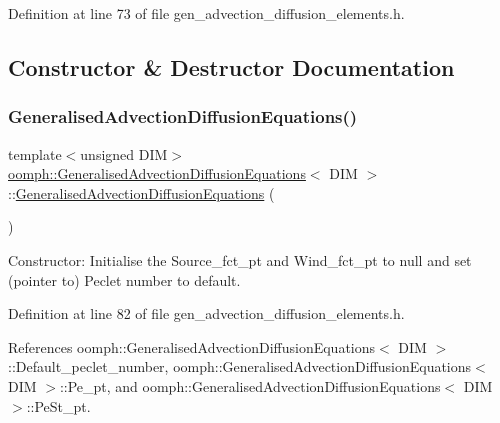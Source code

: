 Definition at line 73 of file gen\+\_\+advection\+\_\+diffusion\+\_\+elements.\+h.



\subsection{Constructor \& Destructor Documentation}
\mbox{\label{classoomph_1_1GeneralisedAdvectionDiffusionEquations_a396bf7221fdeddac42b41599ba81e9f3}} 
\subsubsection{\texorpdfstring{Generalised\+Advection\+Diffusion\+Equations()}{GeneralisedAdvectionDiffusionEquations()}\hspace{0.1cm}{\footnotesize\ttfamily [1/2]}}
{\footnotesize\ttfamily template$<$unsigned D\+IM$>$ \\
\hyperlink{classoomph_1_1GeneralisedAdvectionDiffusionEquations}{oomph\+::\+Generalised\+Advection\+Diffusion\+Equations}$<$ D\+IM $>$\+::\hyperlink{classoomph_1_1GeneralisedAdvectionDiffusionEquations}{Generalised\+Advection\+Diffusion\+Equations} (\begin{DoxyParamCaption}{ }\end{DoxyParamCaption})\hspace{0.3cm}{\ttfamily [inline]}}



Constructor\+: Initialise the Source\+\_\+fct\+\_\+pt and Wind\+\_\+fct\+\_\+pt to null and set (pointer to) Peclet number to default. 



Definition at line 82 of file gen\+\_\+advection\+\_\+diffusion\+\_\+elements.\+h.



References oomph\+::\+Generalised\+Advection\+Diffusion\+Equations$<$ D\+I\+M $>$\+::\+Default\+\_\+peclet\+\_\+number, oomph\+::\+Generalised\+Advection\+Diffusion\+Equations$<$ D\+I\+M $>$\+::\+Pe\+\_\+pt, and oomph\+::\+Generalised\+Advection\+Diffusion\+Equations$<$ D\+I\+M $>$\+::\+Pe\+St\+\_\+pt.


